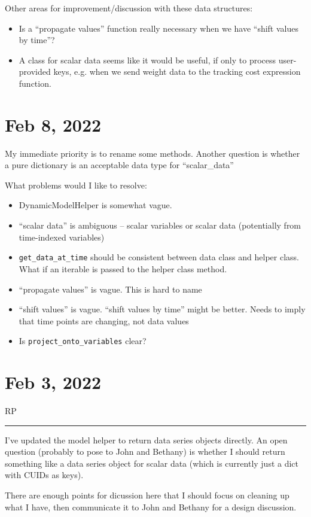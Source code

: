 \documentclass{article}
\newcommand{\RP}{\vspace{0.5cm}RP\vspace{0.2cm}\hrule\vspace{0.2cm}}
\begin{document}
Other areas for improvement/discussion with these data structures:
\begin{itemize}
  \item Is a ``propagate values'' function really necessary when we
    have ``shift values by time''?
  \item A class for scalar data seems like it would be useful, if only to
    process user-provided keys, e.g. when we send weight data to
    the tracking cost expression function.
\end{itemize}

\section{Feb 8, 2022}

My immediate priority is to rename some methods.
Another question is whether a pure dictionary is an acceptable
data type for ``scalar\_data''

What problems would I like to resolve:
\begin{itemize}
  \item DynamicModelHelper is somewhat vague.
  \item ``scalar data'' is ambiguous -- scalar variables or
    scalar data (potentially from time-indexed variables)
  \item \texttt{get\_data\_at\_time} should be consistent
    between data class and helper class. What if an iterable is
    passed to the helper class method.
  \item ``propagate values'' is vague. This is hard to name
  \item ``shift values'' is vague. ``shift values by time''
    might be better. Needs to imply that time points are changing,
    not data values
  \item Is \texttt{project\_onto\_variables} clear?
\end{itemize}

\section{Feb 3, 2022}

\RP
I've updated the model helper to return data series objects directly.
An open question (probably to pose to John and Bethany) is whether
I should return something like a data series object for scalar
data (which is currently just a dict with CUIDs as keys).

There are enough points for dicussion here that I should focus on cleaning up
what I have, then communicate it to John and Bethany for a design discussion.
\end{document}
